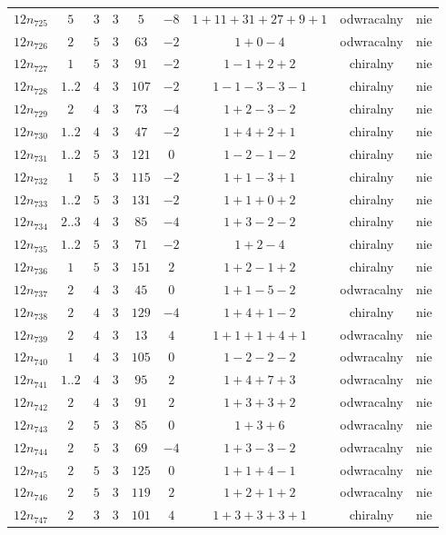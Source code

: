 \begin{longtable}{ccccccccc}
$12n_{725}$ & $5$ & $3$ & $3$ & $5$ & $-8$ & $1+11+31+27+9+1$ & odwracalny & nie \\
$12n_{726}$ & $2$ & $5$ & $3$ & $63$ & $-2$ & $1+0-4$ & odwracalny & nie \\
$12n_{727}$ & $1$ & $5$ & $3$ & $91$ & $-2$ & $1-1+2+2$ & chiralny & nie \\
$12n_{728}$ & $1..2$ & $4$ & $3$ & $107$ & $-2$ & $1-1-3-3-1$ & chiralny & nie \\
$12n_{729}$ & $2$ & $4$ & $3$ & $73$ & $-4$ & $1+2-3-2$ & chiralny & nie \\
$12n_{730}$ & $1..2$ & $4$ & $3$ & $47$ & $-2$ & $1+4+2+1$ & chiralny & nie \\
$12n_{731}$ & $1..2$ & $5$ & $3$ & $121$ & $0$ & $1-2-1-2$ & chiralny & nie \\
$12n_{732}$ & $1$ & $5$ & $3$ & $115$ & $-2$ & $1+1-3+1$ & chiralny & nie \\
$12n_{733}$ & $1..2$ & $5$ & $3$ & $131$ & $-2$ & $1+1+0+2$ & chiralny & nie \\
$12n_{734}$ & $2..3$ & $4$ & $3$ & $85$ & $-4$ & $1+3-2-2$ & chiralny & nie \\
$12n_{735}$ & $1..2$ & $5$ & $3$ & $71$ & $-2$ & $1+2-4$ & chiralny & nie \\
$12n_{736}$ & $1$ & $5$ & $3$ & $151$ & $2$ & $1+2-1+2$ & chiralny & nie \\
$12n_{737}$ & $2$ & $4$ & $3$ & $45$ & $0$ & $1+1-5-2$ & odwracalny & nie \\
$12n_{738}$ & $2$ & $4$ & $3$ & $129$ & $-4$ & $1+4+1-2$ & chiralny & nie \\
$12n_{739}$ & $2$ & $4$ & $3$ & $13$ & $4$ & $1+1+1+4+1$ & odwracalny & nie \\
$12n_{740}$ & $1$ & $4$ & $3$ & $105$ & $0$ & $1-2-2-2$ & odwracalny & nie \\
$12n_{741}$ & $1..2$ & $4$ & $3$ & $95$ & $2$ & $1+4+7+3$ & odwracalny & nie \\
$12n_{742}$ & $2$ & $4$ & $3$ & $91$ & $2$ & $1+3+3+2$ & odwracalny & nie \\
$12n_{743}$ & $2$ & $5$ & $3$ & $85$ & $0$ & $1+3+6$ & odwracalny & nie \\
$12n_{744}$ & $2$ & $5$ & $3$ & $69$ & $-4$ & $1+3-3-2$ & odwracalny & nie \\
$12n_{745}$ & $2$ & $5$ & $3$ & $125$ & $0$ & $1+1+4-1$ & odwracalny & nie \\
$12n_{746}$ & $2$ & $5$ & $3$ & $119$ & $2$ & $1+2+1+2$ & odwracalny & nie \\
$12n_{747}$ & $2$ & $3$ & $3$ & $101$ & $4$ & $1+3+3+3+1$ & chiralny & nie \\

\end{longtable}
